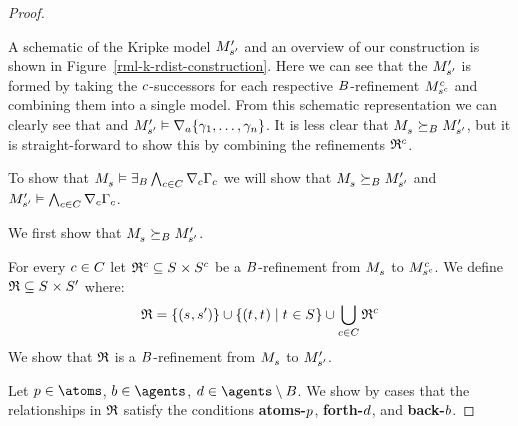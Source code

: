 \begin{proof}
\begin{figure}
\end{figure}

A schematic of the Kripke model $\kPModelP{\kStateSP}$ and an overview of our construction is shown in Figure~\ref{rml-k-rdist-construction}.
Here we can see that the $\kPModelP{\kStateSP}$ is formed by taking the $\agentC$-successors for each respective $\agentsB$-refinement $\kPModel[\agentC]{\kStateS[\agentC]}$ and combining them into a single model.
From this schematic representation we can clearly see that  and $\kPModelP{\kStateSP} \entails \coversA \{\gamma_1, \dots, \gamma_n\}$.
It is less clear that $\kPModel{\kStateS} \simulatesBs \kPModelP{\kStateSP}$, but it is straight-forward to show this by combining the refinements $\refinement^\agentC$.

To show that $\kPModel{\kStateS} \entails \somerefsBs \bigwedge_{\agentC \in \agentsC} \coversC \Gamma_\agentC$ we will show that $\kPModel{\kStateS} \simulatesBs \kPModelP{\kStateSP}$ and $\kPModelP{\kStateSP} \entails \bigwedge_{\agentC \in \agentsC} \coversC \Gamma_\agentC$.

We first show that $\kPModel{\kStateS} \simulatesBs \kPModelP{\kStateSP}$.

For every $\agentC \in \agentsC$ let $\refinement^\agentC \subseteq \kStates \times \kStates[\agentC]$ be a $\agentsB$-refinement from $\kPModel{\kStateS}$ to $\kPModel[\agentC]{\kStateS[\agentC]}$.
We define $\refinement \subseteq \kStates \times \kStatesP$ where:
$$
\refinement = \{(\kStateS, \kStateSP)\} \cup \{(\kStateT, \kStateT) \mid \kStateT \in \kStates\} \cup \bigcup_{\agentC \in \agentsC} \refinement^\agentC
$$
We show that $\refinement$ is a $\agentsB$-refinement from $\kPModel{\kStateS}$ to $\kPModelP{\kStateSP}$.

Let $\atomP \in \atoms$, $\agentB \in \agents$, $\agentD \in \agents \setminus \agentsB$.
We show by cases that the relationships in $\refinement$ satisfy the conditions {\bf atoms-$\atomP$}, {\bf forth-$\agentD$}, and {\bf back-$\agentB$}.


\end{proof}
